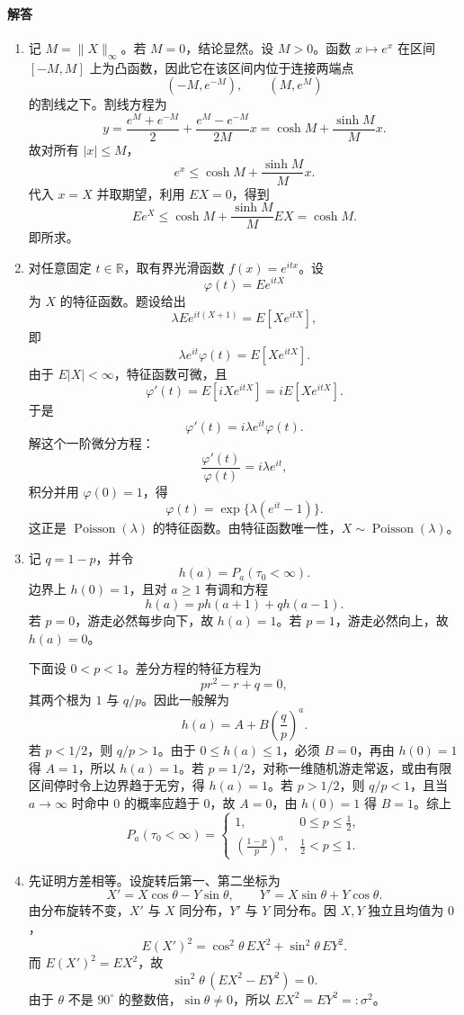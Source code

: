 \documentclass[UTF8,12pt]{ctexart}
\begin{document}
\paragraph{解答}
\begin{enumerate}[label=\textbf{\arabic*.},leftmargin=2.2em]
\item 记 \(M=\|X\|_\infty\)。若 \(M=0\)，结论显然。设 \(M>0\)。函数 \(x\mapsto e^x\) 在区间 \([-M,M]\) 上为凸函数，因此它在该区间内位于连接两端点
\[
(-M,e^{-M}),\qquad (M,e^M)
\]
的割线之下。割线方程为
\[
y=\frac{e^M+e^{-M}}2+\frac{e^M-e^{-M}}{2M}x
=\cosh M+\frac{\sinh M}{M}x.
\]
故对所有 \(|x|\le M\)，
\[
e^x\le \cosh M+\frac{\sinh M}{M}x.
\]
代入 \(x=X\) 并取期望，利用 \(E X=0\)，得到
\[
E e^X\le \cosh M+\frac{\sinh M}{M}E X=\cosh M.
\]
即所求。

\item 对任意固定 \(t\in\mathbb R\)，取有界光滑函数 \(f(x)=e^{itx}\)。设
\[
\varphi(t)=E e^{itX}
\]
为 \(X\) 的特征函数。题设给出
\[
\lambda E e^{it(X+1)}=E[Xe^{itX}],
\]
即
\[
\lambda e^{it}\varphi(t)=E[Xe^{itX}].
\]
由于 \(E|X|<\infty\)，特征函数可微，且
\[
\varphi'(t)=E[iXe^{itX}]=iE[Xe^{itX}].
\]
于是
\[
\varphi'(t)=i\lambda e^{it}\varphi(t).
\]
解这个一阶微分方程：
\[
\frac{\varphi'(t)}{\varphi(t)}=i\lambda e^{it},
\]
积分并用 \(\varphi(0)=1\)，得
\[
\varphi(t)=\exp\{\lambda(e^{it}-1)\}.
\]
这正是 \(\operatorname{Poisson}(\lambda)\) 的特征函数。由特征函数唯一性，\(X\sim\operatorname{Poisson}(\lambda)\)。

\item 记 \(q=1-p\)，并令
\[
h(a)=P_a(\tau_0<\infty).
\]
边界上 \(h(0)=1\)，且对 \(a\ge1\) 有调和方程
\[
h(a)=p h(a+1)+q h(a-1).
\]
若 \(p=0\)，游走必然每步向下，故 \(h(a)=1\)。若 \(p=1\)，游走必然向上，故 \(h(a)=0\)。

下面设 \(0<p<1\)。差分方程的特征方程为
\[
p r^2-r+q=0,
\]
其两个根为 \(1\) 与 \(q/p\)。因此一般解为
\[
h(a)=A+B\left(\frac qp\right)^a.
\]
若 \(p<1/2\)，则 \(q/p>1\)。由于 \(0\le h(a)\le1\)，必须 \(B=0\)，再由 \(h(0)=1\) 得 \(A=1\)，所以 \(h(a)=1\)。若 \(p=1/2\)，对称一维随机游走常返，或由有限区间停时令上边界趋于无穷，得 \(h(a)=1\)。若 \(p>1/2\)，则 \(q/p<1\)，且当 \(a\to\infty\) 时命中 \(0\) 的概率应趋于 \(0\)，故 \(A=0\)，由 \(h(0)=1\) 得 \(B=1\)。综上
\[
P_a(\tau_0<\infty)=
\begin{cases}
1,&0\le p\le \frac12,\\[1mm]
\left(\frac{1-p}{p}\right)^a,&\frac12<p\le1.
\end{cases}
\]

\item 先证明方差相等。设旋转后第一、第二坐标为
\[
X'=X\cos\theta-Y\sin\theta,\qquad
Y'=X\sin\theta+Y\cos\theta.
\]
由分布旋转不变，\(X'\) 与 \(X\) 同分布，\(Y'\) 与 \(Y\) 同分布。因 \(X,Y\) 独立且均值为 \(0\)，
\[
E(X')^2=\cos^2\theta\,E X^2+\sin^2\theta\,E Y^2.
\]
而 \(E(X')^2=E X^2\)，故
\[
\sin^2\theta\,(E X^2-E Y^2)=0.
\]
由于 \(\theta\) 不是 \(90^\circ\) 的整数倍，\(\sin\theta\ne0\)，所以 \(E X^2=E Y^2=:\sigma^2\)。


\end{enumerate}
\end{document}
